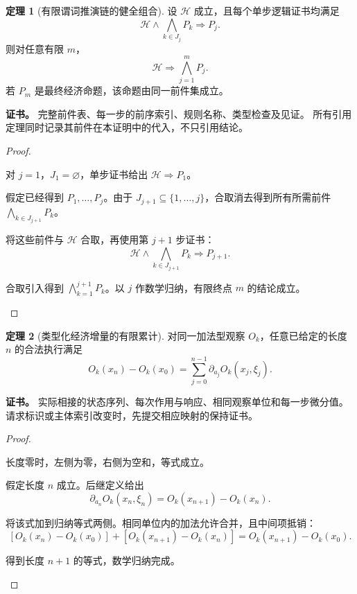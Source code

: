 \documentclass[UTF8,12pt,a4paper,openany,fontset=none,zihao=false]{ctexrep}
\theoremstyle{definition}
\newtheorem{theorem}{定理}[chapter]
\newenvironment{certificate}{\par\noindent\textbf{证书。}\ignorespaces}{\par}
\newcommand{\1}{\mathbf 1}
\begin{document}
\begin{theorem}[有限谓词推演链的健全组合]
\label{atom:proof-induction}
设 \(\mathcal H\) 成立，且每个单步逻辑证书均满足
\[
\mathcal H\land\bigwedge_{k\in J_j}P_k
\Longrightarrow P_j.
\]
则对任意有限 \(m\)，
\[
\boxed{\mathcal H\Longrightarrow\bigwedge_{j=1}^{m}P_j.}
\]
若 \(P_m\) 是最终经济命题，该命题由同一前件集成立。
\end{theorem}
\begin{certificate}
完整前件表、每一步的前序索引、规则名称、类型检查及见证。
所有引用定理同时记录其前件在本证明中的代入，不只引用结论。
\end{certificate}
\begin{proof}
\begin{semanticsteps}
\item 对 \(j=1\)，\(J_1=\varnothing\)，单步证书给出
\(\mathcal H\Rightarrow P_1\)。
\item 假定已经得到 \(P_1,\ldots,P_j\)。由于
\(J_{j+1}\subseteq\{1,\ldots,j\}\)，合取消去得到所有所需前件
\(\bigwedge_{k\in J_{j+1}}P_k\)。
\item 将这些前件与 \(\mathcal H\) 合取，再使用第 \(j+1\) 步证书：
\[
\mathcal H\land\bigwedge_{k\in J_{j+1}}P_k
\Longrightarrow P_{j+1}.
\]
\item 合取引入得到 \(\bigwedge_{k=1}^{j+1}P_k\)。以 \(j\) 作数学归纳，有限终点 \(m\) 的结论成立。
\end{semanticsteps}
\end{proof}

\begin{theorem}[类型化经济增量的有限累计]
\label{atom:telescope}
对同一加法型观察 \(O_k\)，任意已给定的长度 \(n\) 的合法执行满足
\[
\boxed{
O_k(x_n)-O_k(x_0)
=\sum_{j=0}^{n-1}\partial_{a_j}O_k(x_j,\xi_j).
}
\]
\end{theorem}
\begin{certificate}
实际相接的状态序列、每次作用与响应、相同观察单位和每一步微分值。
请求标识或主体索引改变时，先提交相应映射的保持证书。
\end{certificate}
\begin{proof}
\begin{semanticsteps}
\item 长度零时，左侧为零，右侧为空和，等式成立。
\item 假定长度 \(n\) 成立。后继定义给出
\[
\partial_{a_n}O_k(x_n,\xi_n)=O_k(x_{n+1})-O_k(x_n).
\]
\item 将该式加到归纳等式两侧。相同单位内的加法允许合并，且中间项抵销：
\[
[O_k(x_n)-O_k(x_0)]+[O_k(x_{n+1})-O_k(x_n)]
=O_k(x_{n+1})-O_k(x_0).
\]
\item 得到长度 \(n+1\) 的等式，数学归纳完成。
\end{semanticsteps}
\end{proof}
\end{document}
